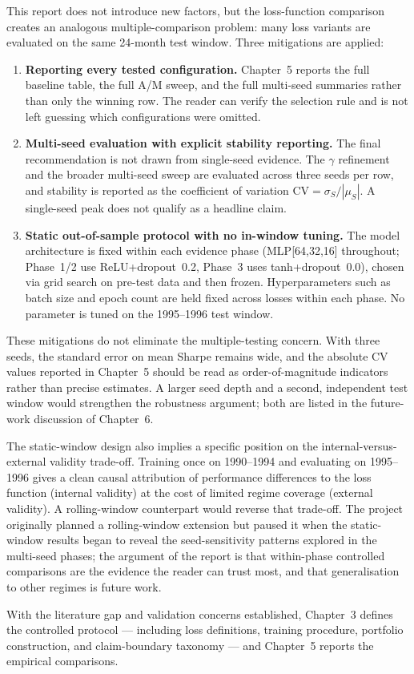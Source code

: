 This report does not introduce new factors, but the loss-function comparison creates an analogous multiple-comparison problem: many loss variants are evaluated on the same 24-month test window. Three mitigations are applied:

\begin{enumerate}
 \item \textbf{Reporting every tested configuration.} Chapter~5 reports the full baseline table, the full A/M sweep, and the full multi-seed summaries rather than only the winning row. The reader can verify the selection rule and is not left guessing which configurations were omitted.
 \item \textbf{Multi-seed evaluation with explicit stability reporting.} The final recommendation is not drawn from single-seed evidence. The $\gamma$ refinement and the broader multi-seed sweep are evaluated across three seeds per row, and stability is reported as the coefficient of variation $\mathrm{CV} = \sigma_S / |\mu_S|$. A single-seed peak does not qualify as a headline claim.
 \item \textbf{Static out-of-sample protocol with no in-window tuning.} The model architecture is fixed within each evidence phase (MLP[64,32,16] throughout; Phase~1/2 use ReLU+dropout~0.2, Phase~3 uses tanh+dropout~0.0), chosen via grid search on pre-test data and then frozen. Hyperparameters such as batch size and epoch count are held fixed across losses within each phase. No parameter is tuned on the 1995--1996 test window.
\end{enumerate}

These mitigations do not eliminate the multiple-testing concern. With three seeds, the standard error on mean Sharpe remains wide, and the absolute CV values reported in Chapter~5 should be read as order-of-magnitude indicators rather than precise estimates. A larger seed depth and a second, independent test window would strengthen the robustness argument; both are listed in the future-work discussion of Chapter~6.

The static-window design also implies a specific position on the internal-versus-external validity trade-off. Training once on 1990--1994 and evaluating on 1995--1996 gives a clean causal attribution of performance differences to the loss function (internal validity) at the cost of limited regime coverage (external validity). A rolling-window counterpart would reverse that trade-off. The project originally planned a rolling-window extension but paused it when the static-window results began to reveal the seed-sensitivity patterns explored in the multi-seed phases; the argument of the report is that within-phase controlled comparisons are the evidence the reader can trust most, and that generalisation to other regimes is future work.

With the literature gap and validation concerns established, Chapter~3 defines the controlled protocol --- including loss definitions, training procedure, portfolio construction, and claim-boundary taxonomy --- and Chapter~5 reports the empirical comparisons.
